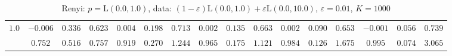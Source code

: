 \begin{table}[ht]
\begin{center}
\begin{tabular}{|c|ccc|ccc|ccc|ccc|ccc|}
$1.0$ & $ -0.006 $ & $ 0.336 $ & $ 0.623 $ & $ 0.004 $ & $ 0.198 $ & $ 0.713 $ & $ 0.002 $ & $ 0.135 $ & $ 0.663 $ & $ 0.002 $ & $ 0.090 $ & $ 0.653 $ & $ -0.001 $ & $ 0.056 $ & $ 0.739 $\\ 
 & $ 0.752 $ & $ 0.516 $ & $ 0.757 $ & $ 0.919 $ & $ 0.270 $ & $ 1.244 $ & $ 0.965 $ & $ 0.175 $ & $ 1.121 $ & $ 0.984 $ & $ 0.126 $ & $ 1.675 $ & $ 0.995 $ & $ 0.074 $ & $ 3.065 $\\ 
\hline 
\end{tabular}
\caption{Renyi: $p = \mathrm{L}(0.0,1.0)$, data: $(1-\varepsilon)\mathrm{L}(0.0,1.0) + \varepsilon \mathrm{L}(0.0,10.0)$, $\varepsilon =  0.01$, $K = 1000$} 
\end{center}
\end{table}
